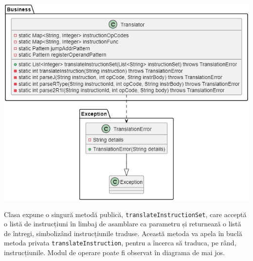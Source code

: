\documentclass{article}
\begin{document}
\begin{tcolorbox}[colback=white!5!white,colframe=violet!75!black,title=Diagramă de clasa - Translator]
\includegraphics[width=\textwidth]{img/classTranslator.png}
\end{tcolorbox}

Clasa expune o singură metodă publică, \texttt{translateInstructionSet}, care acceptă o listă de instrucțiuni în limbaj de asamblare ca parametru și returnează o listă de întregi, simbolizând instrucțiunile traduse. Această metoda va apela în buclă metoda privata \texttt{translateInstruction}, pentru a încerca să traduca, pe rând, instrucțiunile. Modul de operare poate fi observat în diagrama de mai jos.
\end{document}
